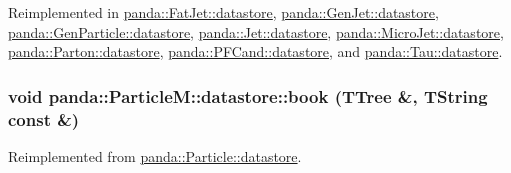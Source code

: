 Reimplemented in \hyperlink{structpanda_1_1FatJet_1_1datastore_a5df5d3f7ed3b3d1d70f99dcb6a9c25e4}{panda::FatJet::datastore}, \hyperlink{structpanda_1_1GenJet_1_1datastore_a8b05278d242cae6efa7c1cc2ed929d6a}{panda::GenJet::datastore}, \hyperlink{structpanda_1_1GenParticle_1_1datastore_a431a6d40dc4affce7107d9368d2932a9}{panda::GenParticle::datastore}, \hyperlink{structpanda_1_1Jet_1_1datastore_a899f59963d18c2c13019d9ed27eb7745}{panda::Jet::datastore}, \hyperlink{structpanda_1_1MicroJet_1_1datastore_a09aae2ebbbda55c6616b6a693f43bb66}{panda::MicroJet::datastore}, \hyperlink{structpanda_1_1Parton_1_1datastore_ab13044f2228c663b73a6e24f0967a445}{panda::Parton::datastore}, \hyperlink{structpanda_1_1PFCand_1_1datastore_af5aef7147e657b4f1b4125f3dae0dc39}{panda::PFCand::datastore}, and \hyperlink{structpanda_1_1Tau_1_1datastore_a6f817076ea4ed71fc8b66c70a834b39d}{panda::Tau::datastore}.\hypertarget{structpanda_1_1ParticleM_1_1datastore_ae2eb76ca042d8b3e899c027ee07b5860}{
\subsubsection[{book}]{\setlength{\rightskip}{0pt plus 5cm}void panda::ParticleM::datastore::book (TTree \&, \/  TString const \&)}}
\label{structpanda_1_1ParticleM_1_1datastore_ae2eb76ca042d8b3e899c027ee07b5860}


Reimplemented from \hyperlink{structpanda_1_1Particle_1_1datastore_af75a5d8b8a18ee09ce98ab37888b4404}{panda::Particle::datastore}.

